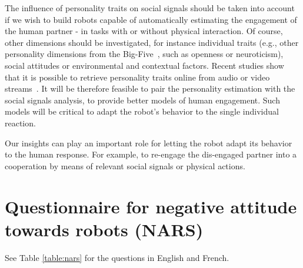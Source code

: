 \documentclass[twocolumn]{svjour3}          %
\begin{document}
The influence of personality traits on social signals should be taken into account if we wish to build robots capable of automatically estimating the engagement of the human partner - in tasks with or without physical interaction.
Of course, other dimensions should be investigated, for instance individual traits (e.g., other personality dimensions from the Big-Five~\cite{BIGFIVE}, such as openness or neuroticism), social attitudes or environmental and contextual factors. 
Recent studies show that it is possible to retrieve personality traits online from audio or video streams~\cite{mohammadi2012automatic}. 
It will be therefore feasible to pair the personality estimation with the social signals analysis, to provide better models of human engagement. Such models will be critical to adapt the robot's behavior to the single individual reaction.

Our insights can play an important role for letting the robot adapt its behavior to the human response. For example, to re-engage the dis-engaged partner into a cooperation by means of relevant social signals or physical actions.








\section{Questionnaire for negative attitude towards robots (NARS)}\label{appendix:nars}

See Table \ref{table:nars} for the questions in English and French.
\end{document}
